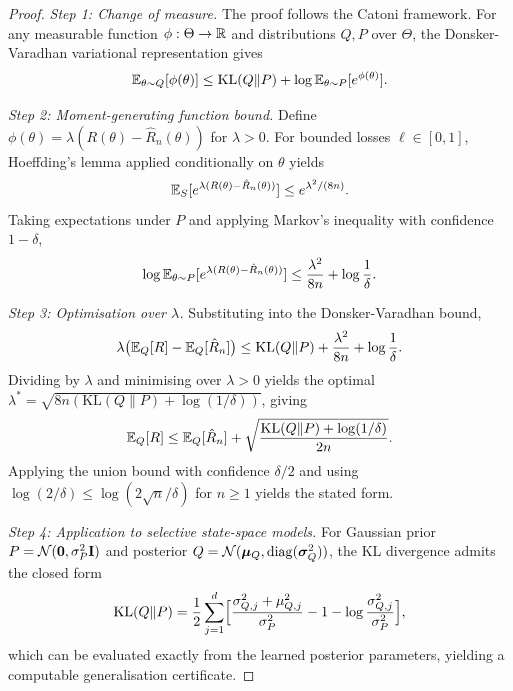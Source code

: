 \begin{proof}
\textit{Step 1: Change of measure.} The proof follows the Catoni framework. For any measurable function $\phi:\Theta\to\mathbb{R}$ and distributions $Q,P$ over $\Theta$, the Donsker-Varadhan variational representation gives
\begin{equation}
\mathbb{E}_{\theta\sim Q}[\phi(\theta)] \le \mathrm{KL}(Q\|P) + \log\mathbb{E}_{\theta\sim P}[e^{\phi(\theta)}].
\end{equation}

\textit{Step 2: Moment-generating function bound.} Define $\phi(\theta) = \lambda(R(\theta)-\hat{R}_n(\theta))$ for $\lambda>0$. For bounded losses $\ell\in[0,1]$, Hoeffding's lemma applied conditionally on $\theta$ yields
\begin{equation}
\mathbb{E}_S[e^{\lambda(R(\theta)-\hat{R}_n(\theta))}] \le e^{\lambda^2/(8n)}.
\end{equation}
Taking expectations under $P$ and applying Markov's inequality with confidence $1-\delta$,
\begin{equation}
\log\mathbb{E}_{\theta\sim P}[e^{\lambda(R(\theta)-\hat{R}_n(\theta))}] \le \frac{\lambda^2}{8n} + \log\frac{1}{\delta}.
\end{equation}

\textit{Step 3: Optimisation over $\lambda$.} Substituting into the Donsker-Varadhan bound,
\begin{equation}
\lambda\bigl(\mathbb{E}_Q[R]-\mathbb{E}_Q[\hat{R}_n]\bigr) \le \mathrm{KL}(Q\|P) + \frac{\lambda^2}{8n} + \log\frac{1}{\delta}.
\end{equation}
Dividing by $\lambda$ and minimising over $\lambda>0$ yields the optimal $\lambda^* = \sqrt{8n(\mathrm{KL}(Q\|P)+\log(1/\delta))}$, giving
\begin{equation}
\mathbb{E}_Q[R] \le \mathbb{E}_Q[\hat{R}_n] + \sqrt{\frac{\mathrm{KL}(Q\|P)+\log(1/\delta)}{2n}}.
\end{equation}
Applying the union bound with confidence $\delta/2$ and using $\log(2/\delta)\le\log(2\sqrt{n}/\delta)$ for $n\ge 1$ yields the stated form.

\textit{Step 4: Application to selective state-space models.} For Gaussian prior $P=\mathcal{N}(\mathbf{0},\sigma_P^2\mathbf{I})$ and posterior $Q=\mathcal{N}(\bm{\mu}_Q,\mathrm{diag}(\bm{\sigma}_Q^2))$, the KL divergence admits the closed form
\begin{equation}
\mathrm{KL}(Q\|P) = \frac{1}{2}\sum_{j=1}^d\Bigl[\frac{\sigma_{Q,j}^2+\mu_{Q,j}^2}{\sigma_P^2}-1-\log\frac{\sigma_{Q,j}^2}{\sigma_P^2}\Bigr],
\end{equation}
which can be evaluated exactly from the learned posterior parameters, yielding a computable generalisation certificate.
\end{proof}


